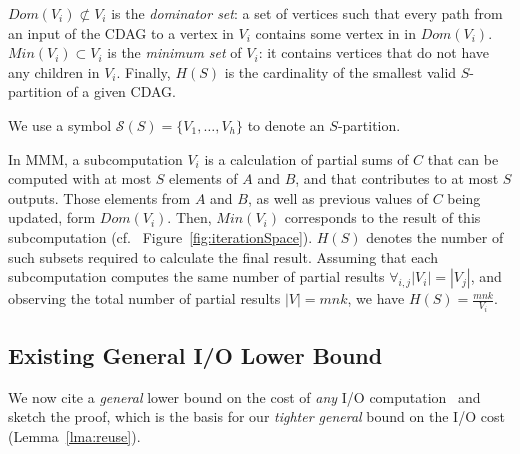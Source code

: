 $Dom(V_i) \not \subset V_i$ is the \emph{dominator set}: a set of vertices 
such 
that
every path from an input of the CDAG to a vertex in $V_i$ contains some 
vertex in in
$Dom(V_i)$.
%
$Min(V_i) \subset V_i$ is the \emph{minimum set} of $V_i$: it contains vertices
that do not have any children in $V_i$. 
%
%
Finally, $H(S)$ is the cardinality of the smallest valid $S$-partition of a
given CDAG.

We use a symbol $\mathcal{S}(S) = \{V_1, \dots , V_h\}$ to 
denote an $S$-partition. 
%

%
In MMM, a subcomputation $V_i$ is a calculation of partial sums of $C$ that can
be computed with at most $S$ elements of $A$ and $B$, and that contributes to
at most $S$ outputs. Those elements from $A$ and $B$, as well as previous
values of $C$ being updated, form $Dom(V_i)$. Then, $Min(V_i)$ corresponds to
the result of this subcomputation (cf.~
Figure~\ref{fig:iterationSpace}). $H(S)$ denotes 
the
number of such subsets required to calculate the final result. Assuming that 
each subcomputation computes the same number of partial results 
$\forall_{i,j}|V_i| = |V_j|$, and observing the total number of partial 
results 
$|V| = mnk$, we have $H(S) = \frac{mnk}{V_i}$.

\subsection{Existing General I/O Lower Bound}
\label{sec:spartProof}


We now cite a \emph{general} lower bound on the cost of \emph{any} I/O
computation~\cite{redblue} and sketch the proof, which is the basis for our
\emph{tighter general} bound on the I/O cost (Lemma~\ref{lma:reuse}).

